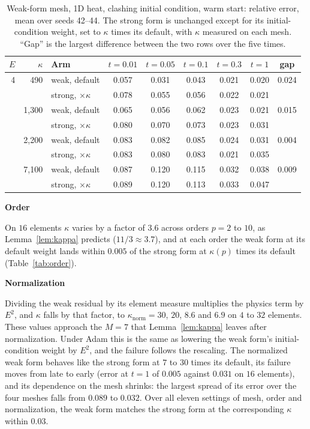 \documentclass[a4paper,fleqn]{cas-sc}
\newcommand{\runhead}[1]{\par\medskip\noindent\textbf{#1}\par\nopagebreak\noindent\ignorespaces}
\begin{document}
\begin{table}[htbp]
\centering
\caption{Weak-form mesh, 1D heat, clashing initial condition, warm start: relative error, mean over seeds 42--44. The
strong form is unchanged except for its initial-condition weight, set to $\kappa$ times its default, with $\kappa$
measured on each mesh. ``Gap'' is the largest difference between the two rows over the five times.}
\label{tab:mesh}
\small
\setlength{\tabcolsep}{4pt}
\begin{tabular}{rrlcccccc}
\toprule
$E$ & $\kappa$ & Arm & $t=0.01$ & $t=0.05$ & $t=0.1$ & $t=0.3$ & $t=1$ & gap \\
\midrule
4 & 490 & weak, default & 0.057 & 0.031 & 0.043 & 0.021 & 0.020 & 0.024 \\
 & & strong, $\times\kappa$ & 0.078 & 0.055 & 0.056 & 0.022 & 0.021 & \\
\addlinespace
8 & 1{,}300 & weak, default & 0.065 & 0.056 & 0.062 & 0.023 & 0.021 & 0.015 \\
 & & strong, $\times\kappa$ & 0.080 & 0.070 & 0.073 & 0.023 & 0.031 & \\
\addlinespace
16 & 2{,}200 & weak, default & 0.083 & 0.082 & 0.085 & 0.024 & 0.031 & 0.004 \\
 & & strong, $\times\kappa$ & 0.083 & 0.080 & 0.083 & 0.021 & 0.035 & \\
\addlinespace
32 & 7{,}100 & weak, default & 0.087 & 0.120 & 0.115 & 0.032 & 0.038 & 0.009 \\
 & & strong, $\times\kappa$ & 0.089 & 0.120 & 0.113 & 0.033 & 0.047 & \\
\bottomrule
\end{tabular}
\end{table}

\runhead{Order}
On $16$ elements $\kappa$ varies by a factor of $3.6$ across orders $p=2$ to $10$, as
Lemma~\ref{lem:kappa} predicts ($11/3\approx3.7$), and at each order the weak form at its default weight lands within
$0.005$ of the strong form at $\kappa(p)$ times its default (Table~\ref{tab:order}).

\runhead{Normalization}
Dividing the weak residual by its element measure multiplies the physics term by $E^2$, and
$\kappa$ falls by that factor, to $\kappa_{\mathrm{norm}}=30$, $20$, $8.6$ and $6.9$ on $4$ to $32$ elements. These values
approach the $M=7$ that Lemma~\ref{lem:kappa} leaves after normalization. Under Adam this is the same as lowering the weak form's initial-condition weight by
$E^2$, and the failure follows the rescaling. The normalized weak form behaves like the strong form at $7$ to $30$ times
its default, its failure moves from late to early (error at $t=1$ of $0.005$ against $0.031$ on $16$ elements), and its
dependence on the mesh shrinks: the largest spread of its error over the four meshes falls from $0.089$ to $0.032$. Over
all eleven settings of mesh, order and normalization, the weak form matches the strong form at the corresponding $\kappa$
within $0.03$.
\end{document}
